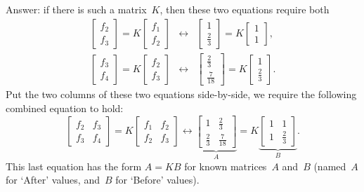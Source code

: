 \begin{example}
\begin{solution}
\begin{enumerate}
Answer: if there is such a matrix~\(K\), then these two equations require both
\begin{eqnarray*}
\begin{bmatrix} f_2\\f_3 \end{bmatrix}
=K\begin{bmatrix} f_1\\f_2 \end{bmatrix}
&\leftrightarrow& \begin{bmatrix} 1\\\frac23 \end{bmatrix}
=K\begin{bmatrix} 1\\1 \end{bmatrix},
\\
\begin{bmatrix} f_3\\f_4 \end{bmatrix}
=K\begin{bmatrix} f_2\\f_3 \end{bmatrix}
&\leftrightarrow& \begin{bmatrix} \frac23\\\frac7{18} \end{bmatrix}
=K\begin{bmatrix} 1\\\frac23 \end{bmatrix}.
\end{eqnarray*}
Put the two columns of these two equations side-by-side, we require the following combined equation to hold:
\begin{equation*}
\begin{bmatrix} f_2&f_3\\f_3&f_4 \end{bmatrix}
=K\begin{bmatrix} f_1&f_2\\f_2&f_3 \end{bmatrix}
\leftrightarrow 
\underbrace{\begin{bmatrix} 1&\frac23\\\frac23&\frac7{18} \end{bmatrix}}_A
=K\underbrace{\begin{bmatrix} 1&1\\1&\frac23 \end{bmatrix}}_B.
\end{equation*}
This last equation has the form \(A=KB\) for known matrices~\(A\) and~\(B\) (named~\(A\) for `After' values, and~\(B\) for `Before' values).


\end{enumerate}
\end{solution}
\end{example}
